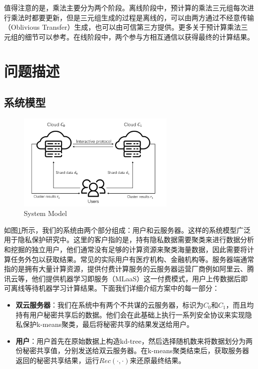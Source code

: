 值得注意的是，乘法主要分为两个阶段。离线阶段中，预计算的乘法三元组每次进行乘法时都要更新，但是三元组生成的过程是离线的，可以由两方通过不经意传输（Oblivious Transfer）生成\cite{schneider2013gmw}，也可以由可信第三方提供\cite{riazi2018chameleon}。更多关于预计算乘法三元组的细节可以参考\cite{beaver1992efficient}。在线阶段中，两个参与方相互通信以获得最终的计算结果。
\section{问题描述}
\label{s3-wenti}
\subsection{系统模型}
\begin{figure}[htbp]
	\centering
	\includegraphics[width=3in]{img/fig5.png}%
	\caption{System Model}
	\label{sys model}
\end{figure}
如图\ref{sys model}所示，我们的系统由两个部分组成：用户和云服务器。这样的系统模型广泛用于隐私保护研究中\cite{wu2020secure}\cite{bunn2007secure}。这里的客户指的是，持有隐私数据需要聚类来进行数据分析和挖掘的独立用户，他们通常没有足够的计算资源来聚类海量数据，因此需要将计算任务外包以获取结果。常见的实际用户有医疗机构、金融机构等。服务器端通常指的是拥有大量计算资源，提供付费计算服务的云服务器运营厂商例如阿里云、腾讯云等，他们提供机器学习即服务（MLaaS）这一付费模式，用户上传数据后即可离线等待机器学习计算结果。下面我们详细介绍方案中的每一部分：

\begin{itemize}
	\item \textbf{双云服务器}：我们在系统中有两个不共谋的云服务器，标识为$ C_0 $和$ C_1 $，而且均持有用户秘密共享后的数据。他们会在此基础上执行一系列安全协议来实现隐私保护k-means聚类，最后将秘密共享的结果发送给用户。
	\item \textbf{用户}：用户首先在原始数据上构造kd-tree，然后选择随机数来将数据划分为两份秘密共享值，分别发送给双云服务器。在k-means聚类结束后，获取服务器返回的秘密共享结果，运行$ Rec(\cdot,\cdot) $来还原最终结果。
\end{itemize}

